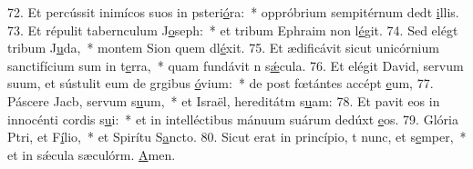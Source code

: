 72. Et percússit inimícos suos in psteri\uline{ó}ra:~* oppróbrium sempitérnum dedt \uline{i}llis.
73. Et répulit tabernculum J\uline{o}seph:~* et tribum Ephraim non l\uline{é}git.
74. Sed elégt tribum J\uline{u}da,~* montem Sion quem dl\uline{é}xit.
75. Et ædificávit sicut unicórnium sanctifícium sum in t\uline{e}rra,~* quam fundávit n s\uline{ǽ}cula.
76. Et elégit David, servum suum, et sústulit eum de grgibus \uline{ó}vium:~* de post fœtántes accépt \uline{e}um,
77. Páscere Jacb, servum s\uline{u}um,~* et Israël, hereditátm s\uline{u}am:
78. Et pavit eos in innocénti cordis s\uline{u}i:~* et in intelléctibus mánuum suárum dedúxt \uline{e}os.
79. Glória Ptri, et F\uline{í}lio,~* et Spirítu S\uline{a}ncto.
80. Sicut erat in princípio, t nunc, et s\uline{e}mper,~* et in sǽcula sæculórm. \uline{A}men.
